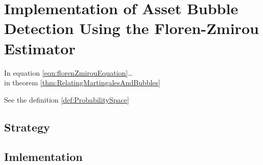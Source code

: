 \chapter{Implementation of Asset Bubble Detection Using the Floren-Zmirou Estimator}
In equation \eqref{eqn:florenZmirouEquation}\ldots\\
in theorem \ref{thm:RelatingMartingalesAndBubbles}\\
\begin{rmk}
See the definition \ref{def:ProbabilitySpace}
\end{rmk}



\section{Strategy}
\section{Imlementation}

